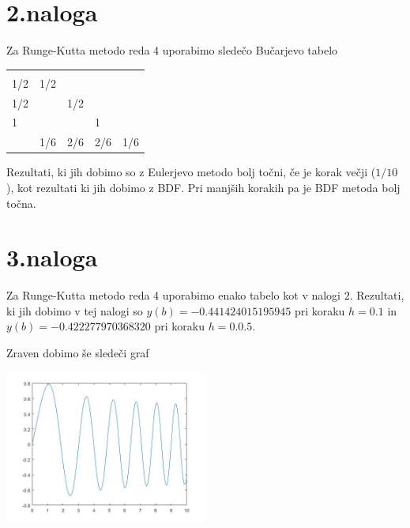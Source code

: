 \documentclass[11pt]{article} %
\begin{document}
\section{2.naloga}

Za Runge-Kutta metodo reda 4 uporabimo sledečo Bučarjevo tabelo

\begin{table}[h]
\begin{tabular}{l|llll}
    &     &     &     &     \\
1/2 & 1/2 &     &     &     \\
1/2 &     & 1/2 &     &     \\
1   &     &     & 1   &     \\ \hline
    & 1/6 & 2/6 & 2/6 & 1/6
\end{tabular}
\end{table}
Rezultati, ki jih dobimo so z Eulerjevo metodo bolj točni, če je korak večji ($1/10$), kot rezultati ki jih dobimo z BDF. Pri manjših korakih pa je BDF metoda bolj točna.

\section{3.naloga}

Za Runge-Kutta metodo reda 4 uporabimo enako tabelo kot v nalogi $2$. Rezultati, ki jih dobimo v tej nalogi so $y(b)= -0.441424015195945$ pri koraku $h=0.1$ in 
$y(b)= -0.422277970368320$ pri koraku $h=0.0.5$.

Zraven dobimo še sledeči graf

\includegraphics[width=0.5\textwidth]{naloga3.jpg}
\end{document}

